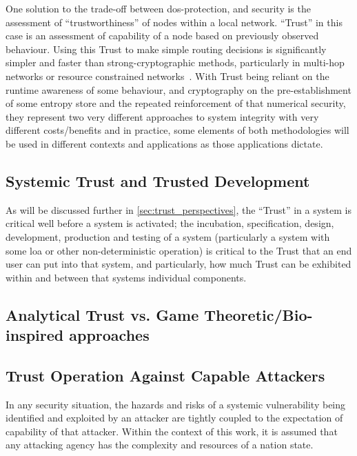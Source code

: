 One solution to the trade-off between \gls{dos}-protection, and security is the assessment of ``trustworthiness'' of nodes within a local network. 
``Trust'' in this case is an assessment of capability of a node based on previously observed behaviour. 
Using this Trust to make simple routing decisions is significantly simpler and faster than strong-cryptographic methods, particularly in multi-hop networks or resource constrained networks~\cite{Cordasco2008}.
With Trust being reliant on the runtime awareness of some behaviour, and cryptography on the pre-establishment of some entropy store and the repeated reinforcement of that numerical security, they represent two very different approaches to system integrity with very different costs/benefits and in practice, some elements of both methodologies will be used in different contexts and applications as those applications dictate.

\subsection{Systemic Trust and Trusted Development}
As will be discussed further in \autoref{sec:trust_perspectives}, the ``Trust'' in a system is critical well before a system is activated; the incubation, specification, design, development, production and testing of a system (particularly a system with some \gls{loa} or other non-deterministic operation) is critical to the Trust that an end user can put into that system, and particularly, how much Trust can be exhibited within and between that systems individual components.

\subsection{Analytical Trust vs. Game Theoretic/Bio-inspired approaches}

\subsection{Trust Operation Against Capable Attackers}\label{sec:capable_attackers}

In any security situation, the hazards and risks of a systemic vulnerability being identified and exploited by an attacker are tightly coupled to the expectation of capability of that attacker.
Within the context of this work, it is assumed that any attacking agency has the complexity and resources of a nation state.

